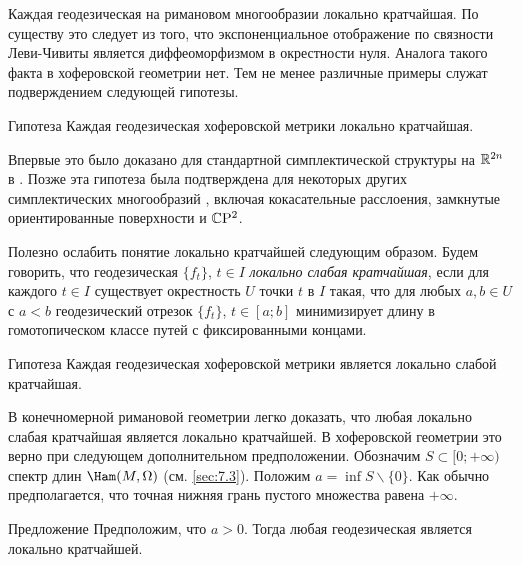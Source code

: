 Каждая геодезическая на римановом многообразии локально кратчайшая.
По существу это следует из того, что экспоненциальное отображение по
связности Леви-Чивиты является диффеоморфизмом в окрестности нуля. 
Аналога такого факта в хоферовской геометрии нет.
Тем не менее различные примеры служат подверждением следующей гипотезы.

\begin{thm}{Гипотеза}\label{12.6.A}
Каждая геодезическая хоферовской метрики локально кратчайшая.
\end{thm}

Впервые это было доказано для стандартной симплектической структуры на
$\mathbb{R}^{2n}$ в \cite{BP1}. 
Позже эта гипотеза была подтверждена для некоторых других
симплектических многообразий \cite{LM2}, включая
кокасательные расслоения, замкнутые ориентированные поверхности и
$\mathbb{C}\mathrm{P}^2$. 

Полезно ослабить понятие локально кратчайшей следующим образом.
Будем говорить, что геодезическая $\{f_t\}$, $t\in I$ \emph{локально слабая кратчайшая}, если для
каждого $t\in I$ существует окрестность $U$ точки $t$ в $I$ такая, что
для любых $a, b\in U$ с $a < b$ геодезический отрезок $\{f_t\}$, $t\in
[a;b]$ минимизирует длину в гомотопическом классе путей с
фиксированными концами. 

\begin{thm}{Гипотеза}\label{12.6.B}
Каждая геодезическая хоферовской метрики является локально слабой кратчайшая.
\end{thm}

В конечномерной римановой геометрии легко доказать, что любая локально
слабая кратчайшая является локально кратчайшей. 
В хоферовской геометрии это верно при следующем дополнительном предположении.
Обозначим $S \subset [0; +\infty)$ спектр длин $\Ham(M, \Omega)$ (см. \ref{sec:7.3}). 
Положим $a = \inf S\backslash\{0\}$.
Как обычно предполагается, что точная нижняя грань пустого множества
равена $+\infty$. 

\begin{thm}[(\cite{LM2})]{Предложение}\label{12.6.C}
Предположим, что $a>0$.
Тогда любая геодезическая является локально кратчайшей.
\end{thm}

